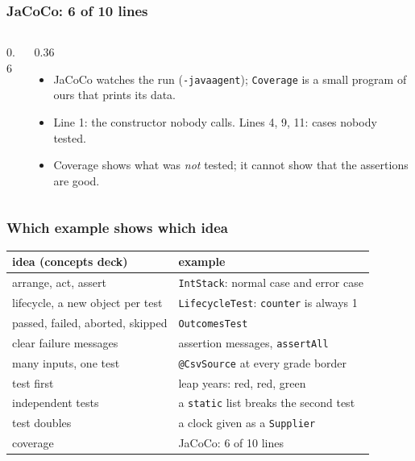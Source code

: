 \documentclass[aspectratio=169,10pt,compress]{beamer}
\begin{document}
\begin{frame}[t,fragile] \frametitle{JaCoCo: 6 of 10 lines}
  \begin{columns}[T]
    \begin{column}{0.6\textwidth}
    \end{column}
    \begin{column}{0.36\textwidth}
      \begin{itemize}\small
        \item JaCoCo watches the run (\texttt{-javaagent}); \texttt{Coverage} is a small program of ours that prints its data.
        \item Line 1: the constructor nobody calls. Lines 4, 9, 11: cases nobody tested.
        \item Coverage shows what was \emph{not} tested; it cannot show that the assertions are good.
      \end{itemize}
    \end{column}
  \end{columns}
\end{frame}





\begin{frame}[t,fragile] \frametitle{Which example shows which idea}
  \begin{center}\small
  \begin{tabular}{ll}
    \toprule
    \textbf{idea (concepts deck)}            & \textbf{example} \\
    \midrule
    arrange, act, assert                     & \texttt{IntStack}: normal case and error case \\
    lifecycle, a new object per test         & \texttt{LifecycleTest}: \texttt{counter} is always 1 \\
    passed, failed, aborted, skipped         & \texttt{OutcomesTest} \\
    clear failure messages                   & assertion messages, \texttt{assertAll} \\
    many inputs, one test                    & \texttt{@CsvSource} at every grade border \\
    test first                               & leap years: red, red, green \\
    independent tests                        & a \texttt{static} list breaks the second test \\
    test doubles                             & a clock given as a \texttt{Supplier} \\
    coverage                                 & JaCoCo: 6 of 10 lines \\
    \bottomrule
  \end{tabular}
  \end{center}
\end{frame}
\end{document}
